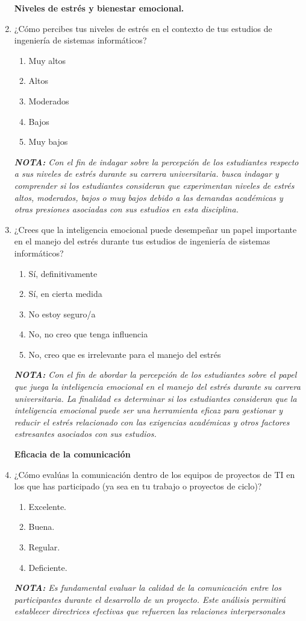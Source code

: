 \documentclass[journal]{IEEEtran}
\begin{document}
\begin{enumerate}
	\begin{center}
	\textbf{Niveles de estrés y bienestar emocional.}
	\end{center}
	\item ¿Cómo percibes tus niveles de estrés en el contexto de tus estudios de ingeniería de sistemas informáticos?
	\begin{enumerate}
		\item Muy altos
		\item Altos
		\item Moderados
		\item Bajos
		\item Muy bajos
	\end{enumerate}
	\textit{\textbf{NOTA:} Con el fin de indagar sobre la percepción de los estudiantes respecto a sus niveles de estrés durante su carrera universitaria. busca indagar y comprender si los estudiantes consideran que experimentan niveles de estrés altos, moderados, bajos o muy bajos debido a las demandas académicas y otras presiones asociadas con sus estudios en esta disciplina.}
	\item ¿Crees que la inteligencia emocional puede desempeñar un papel importante en el manejo del estrés durante tus estudios de ingeniería de sistemas informáticos?
	\begin{enumerate}
		\item Sí, definitivamente
		\item Sí, en cierta medida
		\item No estoy seguro/a
		\item No, no creo que tenga influencia
		\item No, creo que es irrelevante para el manejo del estrés
	\end{enumerate}
	\textit{\textbf{NOTA:} Con el fin de abordar la percepción de los estudiantes sobre el papel que juega la inteligencia emocional en el manejo del estrés durante su carrera universitaria. La finalidad es determinar si los estudiantes consideran que la inteligencia emocional puede ser una herramienta eficaz para gestionar y reducir el estrés relacionado con las exigencias académicas y otros factores estresantes asociados con sus estudios.}
	
	\begin{center}
		\textbf{Eficacia de la comunicación}
	\end{center}
	
	\item ¿Cómo evalúas la comunicación dentro de los equipos de proyectos de TI en los que has participado (ya sea en tu trabajo o proyectos de ciclo)?
	\begin{enumerate}
		\item Excelente.
		\item Buena.
		\item Regular.
		\item Deficiente.
	\end{enumerate}
	\textit{\textbf{NOTA:} Es fundamental evaluar la calidad de la comunicación entre los participantes durante el desarrollo de un proyecto. Este análisis permitirá establecer directrices efectivas que refuercen las relaciones interpersonales}
	

\end{enumerate}
\end{document}
